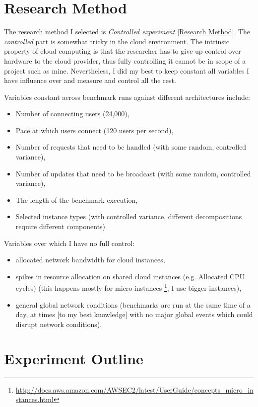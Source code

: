 \documentclass{uvamscse}
\begin{document}
\section{Research Method}
The research method I selected is \textit{Controlled experiment} \ref{Research Method}. The \textit{controlled} part is somewhat tricky in the cloud environment. The intrinsic property of cloud computing is that the researcher has to give up control over hardware to the cloud provider, thus fully controlling it cannot be in scope of a project such as mine. Nevertheless, I did my best to keep constant all variables I have influence over and measure and control all the rest.

Variables constant across benchmark runs against different architectures include:
\begin{itemize}
  \item Number of connecting users (24,000),
  \item Pace at which users connect (120 users per second),
  \item Number of requests that need to be handled (with some random, controlled variance),
  \item Number of updates that need to be broadcast (with some random, controlled variance),
  \item The length of the benchmark execution,
  \item Selected instance types (with controlled variance, different decompositions require different components)
\end{itemize}

Variables over which I have no full control:
\begin{itemize}
  \item allocated network bandwidth for cloud instances,
  \item spikes in resource allocation on shared cloud instances (e.g. Allocated CPU cycles) (this happens mostly for micro instances \footnote{\url{http://docs.aws.amazon.com/AWSEC2/latest/UserGuide/concepts\_micro\_instances.html}}, I use bigger instances),
  \item general global network conditions (benchmarks are run at the same time of a day, at times [to my best knowledge] with no major global events which could disrupt network conditions).
\end{itemize}

\section{Experiment Outline}
\end{document}
